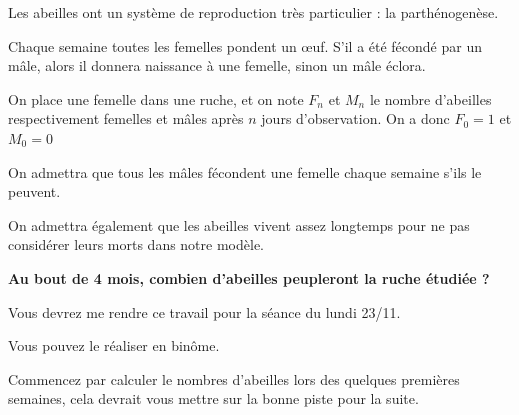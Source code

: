 \documentclass[oneside,12pt]{article}          %
\begin{document}
Les abeilles ont un système de reproduction très particulier : la parthénogenèse.

Chaque semaine toutes les femelles pondent un œuf. S'il a été fécondé par un mâle, alors il donnera naissance à une femelle, sinon un mâle éclora.

On place une femelle dans une ruche, et on note $F_n$ et $M_n$ le nombre d'abeilles respectivement femelles et mâles après $n$ jours d'observation. On a donc $F_0=1$ et $M_0=0$

On admettra que tous les mâles fécondent une femelle chaque semaine s'ils le peuvent.

On admettra également que les abeilles vivent assez longtemps pour ne pas considérer leurs morts dans notre modèle.

\begin{center}
\textbf{Au bout de 4 mois, combien d'abeilles peupleront la ruche étudiée ?}
\end{center}

\begin{tcolorbox}[
    enhanced , arc = 3pt , top = 4mm ,
    fonttitle = \bfseries , title = Consignes \& indications , boxed title style = {arc = 3pt} ,
    coltitle = black , colbacktitle = white ,
    attach boxed title to top left = {xshift = 5mm , yshift = -4mm} ,
	]
	\restoreskip

		Vous devrez me rendre ce travail pour la séance du lundi 23/11.
		
		Vous pouvez le réaliser en binôme.
		
		Commencez par calculer le nombres d'abeilles lors des quelques premières semaines, cela devrait vous mettre sur la bonne piste pour la suite.

\end{tcolorbox}
\end{document}
